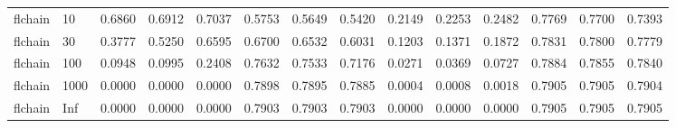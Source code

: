 \begin{tabular}{llrrrrrrrrrrrr}
  flchain & 10 & 0.6860 & 0.6912 & 0.7037 & 0.5753 & 0.5649 & 0.5420 & 0.2149 & 0.2253 & 0.2482 & 0.7769 & 0.7700 & 0.7393 \\ 
  flchain & 30 & 0.3777 & 0.5250 & 0.6595 & 0.6700 & 0.6532 & 0.6031 & 0.1203 & 0.1371 & 0.1872 & 0.7831 & 0.7800 & 0.7779 \\ 
  flchain & 100 & 0.0948 & 0.0995 & 0.2408 & 0.7632 & 0.7533 & 0.7176 & 0.0271 & 0.0369 & 0.0727 & 0.7884 & 0.7855 & 0.7840 \\ 
  flchain & 1000 & 0.0000 & 0.0000 & 0.0000 & 0.7898 & 0.7895 & 0.7885 & 0.0004 & 0.0008 & 0.0018 & 0.7905 & 0.7905 & 0.7904 \\ 
  flchain & Inf & 0.0000 & 0.0000 & 0.0000 & 0.7903 & 0.7903 & 0.7903 & 0.0000 & 0.0000 & 0.0000 & 0.7905 & 0.7905 & 0.7905 \\ 
   \bottomrule
\end{tabular}
